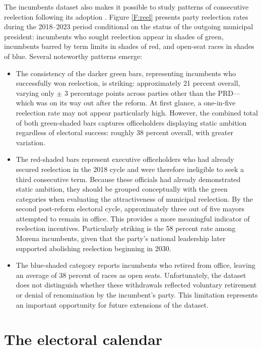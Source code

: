 \documentclass[letter,12pt]{article}
\begin{document}
The incumbents dataset also makes it possible to study patterns of consecutive reelection following its adoption \citep{motolinia-reel-pork2021, lucardi.rosas.Incumbency.2016, lopez.videla.phd.ch1.2021}. Figure \ref{F:reel} presents party reelection rates during the 2018--2023 period conditional on the status of the outgoing municipal president: incumbents who sought reelection appear in shades of green, incumbents barred by term limits in shades of red, and open-seat races in shades of blue. Several noteworthy patterns emerge:

\begin{itemize}
\item The consistency of the darker green bars, representing incumbents who successfully won reelection, is striking: approximately 21 percent overall, varying only $\pm$ 3 percentage points across parties other than the PRD---which was on its way out after the reform. At first glance, a one-in-five reelection rate may not appear particularly high. However, the combined total of both green-shaded bars captures officeholders displaying static ambition regardless of electoral success: roughly 38 percent overall, with greater variation.
\item The red-shaded bars represent executive officeholders who had already secured reelection in the 2018 cycle and were therefore ineligible to seek a third consecutive term. Because these officials had already demonstrated static ambition, they should be grouped conceptually with the green categories when evaluating the attractiveness of municipal reelection. By the second post-reform electoral cycle, approximately three out of five mayors attempted to remain in office. This provides a more meaningful indicator of reelection incentives. Particularly striking is the 58 percent rate among Morena incumbents, given that the party's national leadership later supported abolishing reelection beginning in 2030. 
\item The blue-shaded category reports incumbents who retired from office, leaving an average of 38 percent of races as open seats. Unfortunately, the dataset does not distinguish whether these withdrawals reflected voluntary retirement or denial of renomination by the incumbent's party. This limitation represents an important opportunity for future extensions of the dataset.
\end{itemize}
  
\section{The electoral calendar}\label{S:cal}
\end{document}
